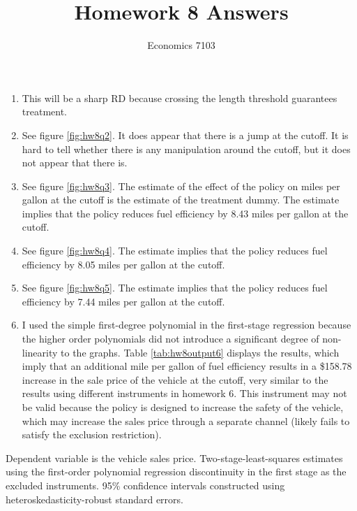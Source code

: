\documentclass{article}
\title{Homework 8 Answers}
\author{Economics 7103}
\begin{document}
  
\maketitle

\begin{enumerate}
    \item This will be a sharp RD because crossing the length threshold guarantees treatment. 
    \item See figure \ref{fig:hw8q2}.  It does appear that there is a jump at the cutoff.  It is hard to tell whether there is any manipulation around the cutoff, but it does not appear that there is.
    \item See figure \ref{fig:hw8q3}.  The estimate of the effect of the policy on miles per gallon at the cutoff is the estimate of the treatment dummy.  The estimate implies that the policy reduces fuel efficiency by 8.43 miles per gallon at the cutoff.
    \item See figure \ref{fig:hw8q4}.  The estimate implies that the policy reduces fuel efficiency by 8.05 miles per gallon at the cutoff.
    \item See figure \ref{fig:hw8q5}.  The estimate implies that the policy reduces fuel efficiency by 7.44 miles per gallon at the cutoff.
    \item I used the simple first-degree polynomial in the first-stage regression because the higher order polynomials did not introduce a significant degree of non-linearity to the graphs.  Table \ref{tab:hw8output6} displays the results, which imply that an additional mile per gallon of fuel efficiency results in a \$158.78 increase in the sale price of the vehicle at the cutoff, very similar to the results using different instruments in homework 6.  This instrument may not be valid because the policy is designed to increase the safety of the vehicle, which may increase the sales price through a separate channel (likely fails to satisfy the exclusion restriction).
\end{enumerate}

\begin{table}[ht]
    \centering
   
    \caption{Dependent variable is the vehicle sales price. Two-stage-least-squares estimates using the first-order polynomial regression discontinuity in the first stage as the excluded instruments.  95\% confidence intervals constructed using heteroskedasticity-robust standard errors.}
    \label{tab:hw8output6}
\end{table}
\end{document}
